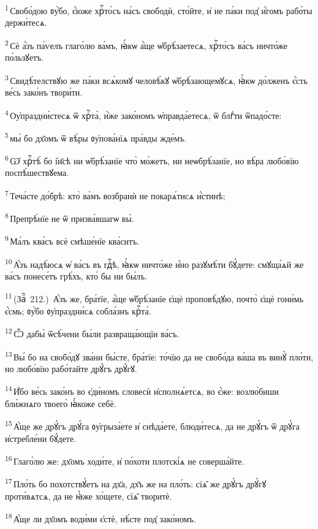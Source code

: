 \textsuperscript{1}\,Свобо́дою ᲂу҆̀бо, є҆́юже хрⷭ҇то́съ на́съ свободѝ, сто́йте, и҆ не па́ки под̾ и҆́гомъ рабо́ты держи́тесѧ.

\textsuperscript{2}\,Сѐ а҆́зъ па́ѵелъ глаго́лю ва́мъ, ꙗ҆́кѡ а҆́ще ѡ҆брѣ́заетесѧ, хрⷭ҇то́съ ва́съ ничто́же по́льзꙋетъ.

\textsuperscript{3}\,Свидѣ́телствꙋю же па́ки всѧ́комꙋ человѣ́кꙋ ѡ҆брѣ́зающемꙋсѧ, ꙗ҆́кѡ до́лженъ є҆́сть ве́сь зако́нъ твори́ти.

\textsuperscript{4}\,Оу҆праздни́стесѧ ѿ хрⷭ҇та̀, и҆̀же зако́номъ ѡ҆правда́етесѧ, ѿ блгⷣти ѿпадо́сте:

\textsuperscript{5}\,мы́ бо дх҃омъ ѿ вѣ́ры ᲂу҆пова́нїѧ пра́вды жде́мъ.

\textsuperscript{6}\,Ѡ҆ хрⷭ҇тѣ́ бо і҆и҃сѣ ни ѡ҆брѣ́занїе что̀ мо́жетъ, ни неѡбрѣ́занїе, но вѣ́ра любо́вїю поспѣ́шествꙋема.

\textsuperscript{7}\,Теча́сте до́брѣ: кто̀ ва́мъ возбранѝ не покарѧ́тисѧ и҆́стинѣ;

\textsuperscript{8}\,Препрѣ́нїе не ѿ призва́вшагѡ вы̀.

\textsuperscript{9}\,Ма́лъ ква́съ всѐ смѣше́нїе ква́ситъ.

\textsuperscript{10}\,А҆́зъ надѣ́юсѧ ѡ҆ ва́съ въ гдⷭ҇ѣ, ꙗ҆́кѡ ничто́же и҆́но разꙋмѣ́ти бꙋ́дете: смꙋща́ѧй же ва́съ понесе́тъ грѣ́хъ, кто́ бы ни бы́лъ.

\textsuperscript{11}\,(Заⷱ҇~212.)~А҆́зъ же, бра́тїе, а҆́ще ѡ҆брѣ́занїе є҆щѐ проповѣ́дꙋю, почто̀ є҆щѐ гони́мь є҆́смь; ᲂу҆̀бо ᲂу҆праздни́сѧ собла́знъ крⷭ҇та̀.

\textsuperscript{12}\,Ѽ дабы̀ ѿсѣ́чени бы́ли развраща́ющїи ва́съ.

\textsuperscript{13}\,Вы́ бо на свобо́дꙋ зва́ни бы́сте, бра́тїе: то́чїю да не свобо́да ва́ша въ винꙋ̀ пло́ти, но любо́вїю рабо́тайте дрꙋ́гъ дрꙋ́гꙋ.

\textsuperscript{14}\,И҆́бо ве́сь зако́нъ во є҆ди́номъ словесѝ и҆сполнѧ́етсѧ, во є҆́же: возлю́биши бли́жнѧго твоего̀ ꙗ҆́коже себѐ.

\textsuperscript{15}\,А҆́ще же дрꙋ́гъ дрꙋ́га ᲂу҆грыза́ете и҆ снѣда́ете, блюди́тесѧ, да не дрꙋ́гъ ѿ дрꙋ́га и҆стребле́ни бꙋ́дете.

\textsuperscript{16}\,Глаго́лю же: дх҃омъ ходи́те, и҆ по́хоти плотскі́ѧ не соверша́йте.

\textsuperscript{17}\,Пло́ть бо похотствꙋ́етъ на дх҃а, дх҃ъ же на пло́ть: сїѧ̑ же дрꙋ́гъ дрꙋ́гꙋ проти́вѧтсѧ, да не ꙗ҆̀же хо́щете, сїѧ̑ творитѐ.

\textsuperscript{18}\,А҆́ще ли дх҃омъ води́ми є҆стѐ, нѣ́сте под̾ зако́номъ.

